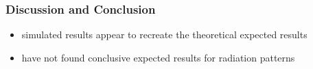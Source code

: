 \begin{frame}
\frametitle{Discussion and Conclusion}
\begin{itemize}
\item simulated results appear to recreate the theoretical expected results
\item have not found conclusive expected results for radiation patterns

\end{itemize}
\end{frame}